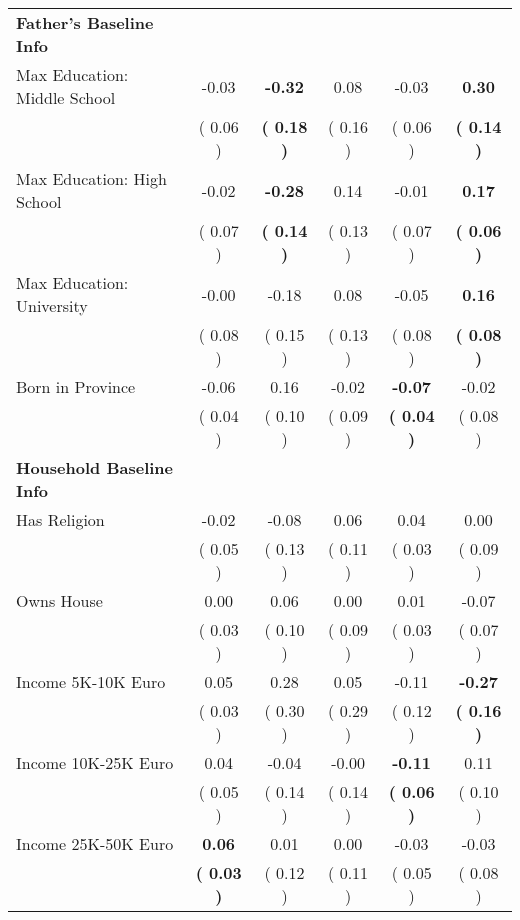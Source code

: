 \begin{table}[H]
{\begin{tabular}{lccccc}
\midrule
\textbf{Father's Baseline Info} \\
\quad Max Education: Middle School &     -0.03 & \textbf{    -0.32} &      0.08 &     -0.03 & \textbf{     0.30} \\
\quad  & (     0.06 ) & \textbf{(     0.18 )}  & (     0.16 )  & (     0.06 ) & \textbf{(     0.14 )} \\
\quad Max Education: High School &     -0.02 & \textbf{    -0.28} &      0.14 &     -0.01 & \textbf{     0.17} \\
\quad  & (     0.07 ) & \textbf{(     0.14 )}  & (     0.13 )  & (     0.07 ) & \textbf{(     0.06 )} \\
\quad Max Education: University &     -0.00 &     -0.18 &      0.08 &     -0.05 & \textbf{     0.16} \\
\quad  & (     0.08 ) & (     0.15 )  & (     0.13 )  & (     0.08 ) & \textbf{(     0.08 )} \\
\quad Born in Province &     -0.06 &      0.16 &     -0.02 & \textbf{    -0.07} &     -0.02 \\
\quad  & (     0.04 ) & (     0.10 )  & (     0.09 )  & \textbf{(     0.04 )} & (     0.08 ) \\
\midrule
\textbf{Household Baseline Info} \\
\quad Has Religion &     -0.02 &     -0.08 &      0.06 &      0.04 &      0.00 \\
\quad  & (     0.05 ) & (     0.13 )  & (     0.11 )  & (     0.03 ) & (     0.09 ) \\
\quad Owns House &      0.00 &      0.06 &      0.00 &      0.01 &     -0.07 \\
\quad  & (     0.03 ) & (     0.10 )  & (     0.09 )  & (     0.03 ) & (     0.07 ) \\
\quad Income 5K-10K Euro &      0.05 &      0.28 &      0.05 &     -0.11 & \textbf{    -0.27} \\
\quad  & (     0.03 ) & (     0.30 )  & (     0.29 )  & (     0.12 ) & \textbf{(     0.16 )} \\
\quad Income 10K-25K Euro &      0.04 &     -0.04 &     -0.00 & \textbf{    -0.11} &      0.11 \\
\quad  & (     0.05 ) & (     0.14 )  & (     0.14 )  & \textbf{(     0.06 )} & (     0.10 ) \\
\quad Income 25K-50K Euro & \textbf{     0.06} &      0.01 &      0.00 &     -0.03 &     -0.03 \\
\quad  & \textbf{(     0.03 )} & (     0.12 )  & (     0.11 )  & (     0.05 ) & (     0.08 ) \\

\end{tabular}}
\end{table}
